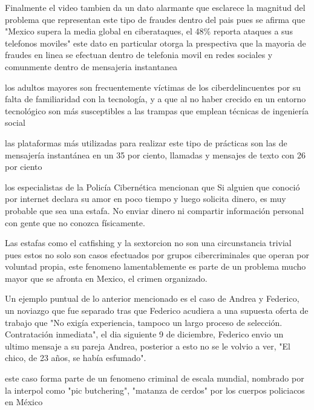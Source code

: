 Finalmente el video tambien da un dato alarmante que esclarece la magnitud del problema que representan este tipo de fraudes dentro del pais pues se afirma que  "Mexico supera la media global en ciberataques, el 48\% reporta ataques a sus telefonos moviles" este dato en particular otorga la prespectiva que la mayoria de fraudes en linea se efectuan dentro de telefonia movil en redes sociales y comunmente dentro de mensajeria instantanea
\cite{heraldo1youtube}

los adultos mayores son frecuentemente víctimas de los ciberdelincuentes por su falta de familiaridad con la tecnología, y a que al no haber crecido en un entorno tecnológico son más susceptibles a las trampas que emplean técnicas de ingeniería social

las plataformas más utilizadas para realizar este tipo de prácticas son las de mensajería instantánea en un 35 por ciento, llamadas y mensajes de texto con 26 por ciento

los especialistas de la Policía Cibernética mencionan que  Si alguien que conoció por internet declara su amor en poco tiempo y luego solicita dinero, es muy probable que sea una estafa. No enviar dinero ni compartir información personal con gente que no conozca físicamente.


\cite{heraldo2025ciberdelitos}

Las estafas como el catfishing y la sextorcion no son una circunstancia trivial pues estos no solo son casos efectuados por grupos cibercriminales que operan por voluntad propia, este fenomeno lamentablemente es parte de un problema mucho mayor que se afronta en Mexico,  el crimen organizado.

Un ejemplo puntual de lo anterior mencionado es el caso de Andrea y Federico, un noviazgo que fue separado tras que Federico acudiera a una supuesta oferta de trabajo que "No exigía experiencia, tampoco un largo proceso de selección. Contratación inmediata", el dia siguiente 9 de diciembre, Federico envio un ultimo mensaje a su pareja Andrea, posterior a esto no se le volvio a ver, "El chico, de 23 años, se había esfumado".

este caso forma parte de un fenomeno criminal de escala mundial, nombrado por la interpol como "pic butchering", "matanza de cerdos" por los cuerpos policiacos en México


